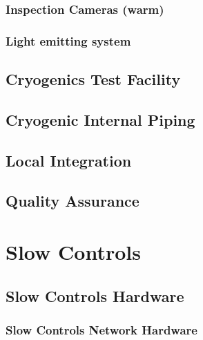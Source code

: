 \subsubsection{Inspection Cameras (warm)}

\subsubsection{Light emitting system}


\subsection{Cryogenics Test Facility}
\label{sec:fddp-slow-cryo-test-facil}

\subsection{Cryogenic Internal Piping}
\label{sec:fddp-slow-cryo-int-piping}

\subsection{Local Integration}
\label{sec:fddp-slow-cryo-loc-integ}


\subsection{Quality Assurance}
\label{sec:fddp-slow-cryo-qa}



\section{Slow Controls}
\label{sec:fddp-slow-cryo-ctrl}




\subsection{Slow Controls Hardware}
\label{sec:fddp-slow-cryo-hdwr}

\subsubsection{Slow Controls Network Hardware}

